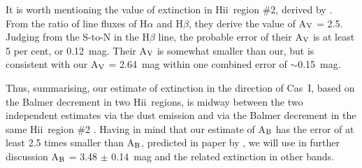 \documentclass[useAMS,usenatbib]{mn2e}
\newcommand{\HII}{H{\sc ii}}
\begin{document}
It is worth  mentioning the value of extinction in \HII\ region $\#$2, derived by \citet{WS1998}.
From the ratio of line fluxes of H$\alpha$ and H$\beta$, they derive the value of A$_{\rm V}$ = 2.5.
Judging from the S-to-N in the H$\beta$ line, the probable error of their A$_{\rm V}$ is at least 5 per cent, or 0.12~mag.
Their A$_{\rm V}$ is somewhat smaller than our, but is consistent with our A$_{\rm V}$ = 2.64~mag within one combined error
of $\sim$0.15~mag.

Thus, summarising, our estimate of extinction in the direction of Cas~I, based on the Balmer decrement
in two \HII\ regions, is midway between the two independent estimates
via the dust emission \citep{Schlafly11} and via the Balmer decrement in the same \HII\ region $\#$2 \citep{WS1998}.
Having in mind that our estimate of A$_{\rm B}$ has the error of at least 2.5 times smaller than A$_{\rm B}$,
predicted in paper by \citet{Schlafly11}, we will use in further discussion A$_{\rm B}$ = 3.48 $\pm$ 0.14~mag and
the related extinction in other bands.

\end{document}
